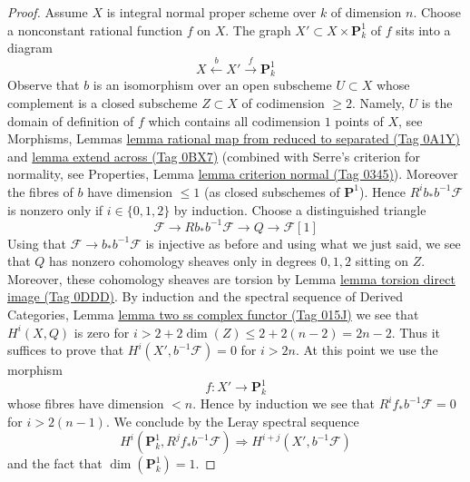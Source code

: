 \documentclass{amsart}
\theoremstyle{plain}
\theoremstyle{definition}
\theoremstyle{remark}
\numberwithin{equation}{subsection}
\begin{document}
\begin{proof}
\medskip\noindent
Assume $X$ is integral normal proper scheme over $k$ of dimension $n$.
Choose a nonconstant rational function $f$ on $X$. The graph
$X' \subset X \times \mathbf{P}^1_k$ of $f$ sits into a diagram
$$
X \xleftarrow{b} X' \xrightarrow{f} \mathbf{P}^1_k
$$
Observe that $b$ is an isomorphism over an open subscheme
$U \subset X$ whose complement is a closed subscheme
$Z \subset X$ of codimension $\geq 2$. Namely, $U$ is the
domain of definition of $f$ which contains all codimension $1$
points of $X$, see
Morphisms, Lemmas \href{https://stacks.math.columbia.edu/tag/0A1Y}{lemma rational map from reduced to separated (Tag 0A1Y)}
and \href{https://stacks.math.columbia.edu/tag/0BX7}{lemma extend across (Tag 0BX7)}
(combined with Serre's criterion for normality, see
Properties, Lemma \href{https://stacks.math.columbia.edu/tag/0345}{lemma criterion normal (Tag 0345)}).
Moreover the fibres of $b$ have dimension $\leq 1$ (as closed subschemes
of $\mathbf{P}^1$). Hence $R^ib_*b^{-1}\mathcal{F}$ is nonzero only
if $i \in \{0, 1, 2\}$ by induction. Choose a distinguished triangle
$$
\mathcal{F} \to Rb_*b^{-1}\mathcal{F} \to Q \to \mathcal{F}[1]
$$
Using that $\mathcal{F} \to b_*b^{-1}\mathcal{F}$ is injective
as before and using what we just said, we see that $Q$ has nonzero
cohomology sheaves only in degrees $0, 1, 2$ sitting on $Z$.
Moreover, these cohomology sheaves are torsion by
Lemma \href{https://stacks.math.columbia.edu/tag/0DDD}{lemma torsion direct image (Tag 0DDD)}.
By induction and the spectral sequence of
Derived Categories, Lemma \href{https://stacks.math.columbia.edu/tag/015J}{lemma two ss complex functor (Tag 015J)}
we see that $H^i(X, Q)$ is zero for
$i > 2 + 2\dim(Z) \leq 2 + 2(n - 2) = 2n - 2$. Thus it suffices
to prove that $H^i(X', b^{-1}\mathcal{F}) = 0$ for
$i > 2n$. At this point we use the morphism
$$
f : X' \to \mathbf{P}^1_k
$$
whose fibres have dimension $< n$. Hence by induction we see that
$R^if_*b^{-1}\mathcal{F} = 0$ for $i > 2(n - 1)$.
We conclude by the Leray spectral sequence
$$
H^i(\mathbf{P}^1_k, R^jf_*b^{-1}\mathcal{F})
\Rightarrow
H^{i + j}(X', b^{-1}\mathcal{F})
$$
and the fact that $\dim(\mathbf{P}^1_k) = 1$.
\end{proof}
\end{document}
